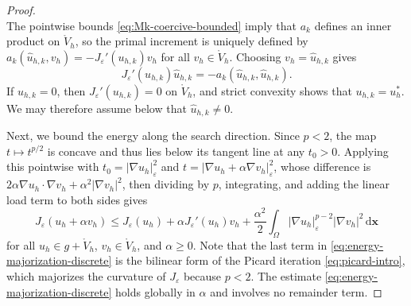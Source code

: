 \documentclass[11pt,pdflatex,sn-mathphys-num]{sn-jnl}
\theoremstyle{thmstyleone}%
\theoremstyle{thmstyletwo}%
\theoremstyle{thmstylethree}%
\newcommand{\bs}[1]{\ensuremath{\boldsymbol{#1}}}
\begin{document}
\begin{proof}
\begin{equation}
\end{equation}
The pointwise bounds \eqref{eq:Mk-coercive-bounded} imply that $a_k$ defines an inner product on $\mathring V_h$, so the primal increment is uniquely defined by $a_k(\hat u_{h,k},v_h)=-J_\varepsilon'(u_{h,k})v_h$ for all $v_h\in\mathring V_h$. Choosing $v_h=\hat u_{h,k}$ gives
\begin{equation}\label{eq:direct-descent-identity}
  J_\varepsilon'(u_{h,k})\hat u_{h,k}
  =-a_k(\hat u_{h,k},\hat u_{h,k}).
\end{equation}
If $\hat u_{h,k}=0$, then $J_\varepsilon'(u_{h,k})=0$ on
$\mathring V_h$, and strict convexity shows that $u_{h,k}=u_h^*$.  We may
therefore assume below that $\hat u_{h,k}\neq0$.

Next, we bound the energy along the search direction. Since $p<2$, the map $t\mapsto t^{p/2}$ is concave and thus lies below its tangent line at any $t_0>0$.
Applying this pointwise with $t_0=|\nabla u_h|_\varepsilon^2$ and $t=|\nabla u_h+\alpha\nabla v_h|_\varepsilon^2$, whose difference is $2\alpha\nabla u_h\!\cdot\!\nabla v_h+\alpha^2|\nabla v_h|^2$, then dividing by $p$, integrating, and adding the linear load term to both sides gives
\begin{equation}\label{eq:energy-majorization-discrete}
  J_\varepsilon(u_h+\alpha v_h)
  \le J_\varepsilon(u_h)+\alpha J_\varepsilon'(u_h)v_h
  +\frac{\alpha^2}{2}\int_\Omega
  |\nabla u_h|_\varepsilon^{p-2}|\nabla v_h|^2\,\mathrm{d}\bs x
\end{equation}
for all $u_h\in g+\mathring V_h$, $v_h\in\mathring V_h$, and $\alpha\ge0$. Note that the last term in \eqref{eq:energy-majorization-discrete} is the bilinear form of the Picard iteration \eqref{eq:picard-intro}, which majorizes the curvature of $J_\varepsilon$ because $p<2$. The estimate \eqref{eq:energy-majorization-discrete} holds globally in $\alpha$ and involves no remainder term.


\end{proof}
\end{document}
